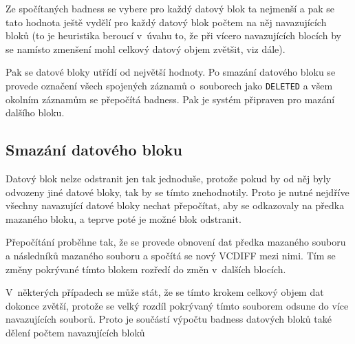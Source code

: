 Ze spočítaných badness se vybere pro každý datový blok ta nejmenší a pak se
tato hodnota ještě vydělí pro každý datový blok počtem na něj navazujících bloků
(to je heuristika beroucí v~úvahu to, že při vícero navazujících blocích by se
namísto zmenšení mohl celkový datový objem zvětšit, viz dále).

Pak se datové bloky utřídí od největší hodnoty. Po smazání datového bloku se
provede označení všech spojených záznamů o~souborech jako \texttt{DELETED} a
všem okolním záznamům se přepočítá badness. Pak je systém připraven pro mazání
dalšího bloku.

\subsection{Smazání datového bloku}

Datový blok nelze odstranit jen tak jednoduše, protože pokud by od něj byly
odvozeny jiné datové bloky, tak by se tímto znehodnotily. Proto je nutné
nejdříve všechny navazující datové bloky nechat přepočítat, aby se odkazovaly
na předka mazaného bloku, a teprve poté je možné blok odstranit.

Přepočítání proběhne tak, že se provede obnovení dat předka mazaného souboru a následníků mazaného souboru a spočítá se nový \gls{VCDIFF} mezi nimi. Tím se
změny pokrývané tímto blokem rozředí do změn v~dalších blocích.

V~některých případech se může stát, že se tímto krokem celkový objem dat dokonce
zvětší, protože se velký rozdíl pokrývaný tímto souborem odsune do více
navazujících souborů. Proto je součástí výpočtu badness datových bloků také
dělení počtem navazujících bloků
